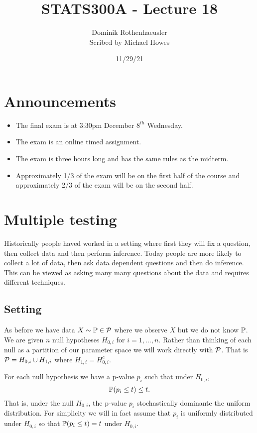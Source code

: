 




\title{STATS300A - Lecture 18}
\author{Dominik Rothenhaeusler\\ Scribed by Michael Howes}
\date{11/29/21}

\pagestyle{fancy}
\fancyhf{}


\maketitle
\tableofcontents
\section{Announcements}
\begin{itemize}
    \item The final exam is at 3:30pm December $8^{th}$ Wednesday.
    \item The exam is an online timed assignment.
    \item The exam is three hours long and has the same rules as the midterm.
    \item Approximately 1/3 of the exam will be on the first half of the course and approximately 2/3 of the exam will be on the second half.
\end{itemize}
\section{Multiple testing}
Historically people haved worked in a setting where first they will fix a question, then collect data and then perform inference. Today people are more likely to collect a lot of data, then ask data dependent questions and then do inference. This can be viewed as asking many many questions about the data and requires different techniques. 
\subsection{Setting}
As before we have data $X \sim {\mathbb{P}} \in {\mathcal{P}}$ where we observe $X$ but we do not know ${\mathbb{P}}$. We are given $n$ null hypotheses $H_{0,i}$ for $i=1,\ldots, n$. Rather than thinking of each null as a partition of our parameter space we will work directly with ${\mathcal{P}}$. That is ${\mathcal{P}} = H_{0,i} \cup H_{1,i}$ where $H_{1,i} = H_{0,i}^c$. 

For each null hypothesis we have a p-value $p_i$ such that under $H_{0,i}$,
\[{\mathbb{P}}(p_i \le t) \le t. \]
That is, under the null $H_{0,i}$, the p-value $p_i$ stochastically dominante the uniform distribution. For simplicity we will in fact assume that $p_i$ is uniformly distributed under $H_{0,i}$ so that ${\mathbb{P}}(p_i \le t)=t$ under $H_{0,i}$. 
